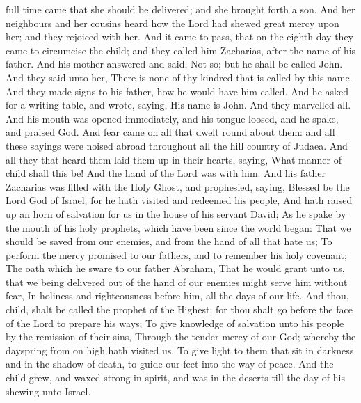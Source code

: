 
\vspace{-0.2\baselineskip}


\vspace{-0.1\baselineskip}

 full time came that she should be delivered; and she brought forth a son. And her neighbours and her cousins heard how the Lord had shewed great mercy upon her; and they rejoiced with her. And it came to pass, that on the eighth day they came to circumcise the child; and they called him Zacharias, after the name of his father. And his mother answered and said, Not so; but he shall be called John. And they said unto her, There is none of thy kindred that is called by this name. And they made signs to his father, how he would have him called. And he asked for a writing table, and wrote, saying, His name is John. And they marvelled all. And his mouth was opened immediately, and his tongue loosed, and he spake, and praised God. And fear came on all that dwelt round about them: and all these sayings were noised abroad throughout all the hill country of Judaea. And all they that heard them laid them up in their hearts, saying, What manner of child shall this be! And the hand of the Lord was with him. And his father Zacharias was filled with the Holy Ghost, and prophesied, saying, Blessed be the Lord God of Israel; for he hath visited and redeemed his people, And hath raised up an horn of salvation for us in the house of his servant David; As he spake by the mouth of his holy prophets, which have been since the world began: That we should be saved from our enemies, and from the hand of all that hate us; To perform the mercy promised to our fathers, and to remember his holy covenant; The oath which he sware to our father Abraham, That he would grant unto us, that we being delivered out of the hand of our enemies might serve him without fear, In holiness and righteousness before him, all the days of our life. And thou, child, shalt be called the prophet of the Highest: for thou shalt go before the face of the Lord to prepare his ways; To give knowledge of salvation unto his people by the remission of their sins, Through the tender mercy of our God; whereby the dayspring from on high hath visited us, To give light to them that sit in darkness and in the shadow of death, to guide our feet into the way of peace. And the child grew, and waxed strong in spirit, and was in the deserts till the day of his shewing unto Israel.

